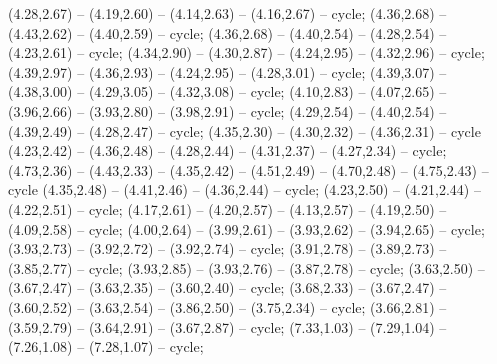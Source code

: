 { (4.28,2.67) -- (4.19,2.60) -- (4.14,2.63) -- (4.16,2.67) -- cycle;
 (4.36,2.68) -- (4.43,2.62) -- (4.40,2.59) -- cycle;
 (4.36,2.68) -- (4.40,2.54) -- (4.28,2.54) -- (4.23,2.61) -- cycle;
 (4.34,2.90) -- (4.30,2.87) -- (4.24,2.95) -- (4.32,2.96) -- cycle;
 (4.39,2.97) -- (4.36,2.93) -- (4.24,2.95) -- (4.28,3.01) -- cycle;
 (4.39,3.07) -- (4.38,3.00) -- (4.29,3.05) -- (4.32,3.08) -- cycle;
 (4.10,2.83) -- (4.07,2.65) -- (3.96,2.66) -- (3.93,2.80) -- (3.98,2.91) -- cycle;
 (4.29,2.54) -- (4.40,2.54) -- (4.39,2.49) -- (4.28,2.47) -- cycle;
 (4.35,2.30) -- (4.30,2.32) -- (4.36,2.31) -- cycle (4.23,2.42) -- (4.36,2.48) -- (4.28,2.44) -- (4.31,2.37) -- (4.27,2.34) -- cycle;
 (4.73,2.36) -- (4.43,2.33) -- (4.35,2.42) -- (4.51,2.49) -- (4.70,2.48) -- (4.75,2.43) -- cycle (4.35,2.48) -- (4.41,2.46) -- (4.36,2.44) -- cycle;
 (4.23,2.50) -- (4.21,2.44) -- (4.22,2.51) -- cycle;
 (4.17,2.61) -- (4.20,2.57) -- (4.13,2.57) -- (4.19,2.50) -- (4.09,2.58) -- cycle;
 (4.00,2.64) -- (3.99,2.61) -- (3.93,2.62) -- (3.94,2.65) -- cycle;
 (3.93,2.73) -- (3.92,2.72) -- (3.92,2.74) -- cycle;
 (3.91,2.78) -- (3.89,2.73) -- (3.85,2.77) -- cycle;
 (3.93,2.85) -- (3.93,2.76) -- (3.87,2.78) -- cycle;
 (3.63,2.50) -- (3.67,2.47) -- (3.63,2.35) -- (3.60,2.40) -- cycle;
 (3.68,2.33) -- (3.67,2.47) -- (3.60,2.52) -- (3.63,2.54) -- (3.86,2.50) -- (3.75,2.34) -- cycle;
 (3.66,2.81) -- (3.59,2.79) -- (3.64,2.91) -- (3.67,2.87) -- cycle;
 (7.33,1.03) -- (7.29,1.04) -- (7.26,1.08) -- (7.28,1.07) -- cycle;
}
